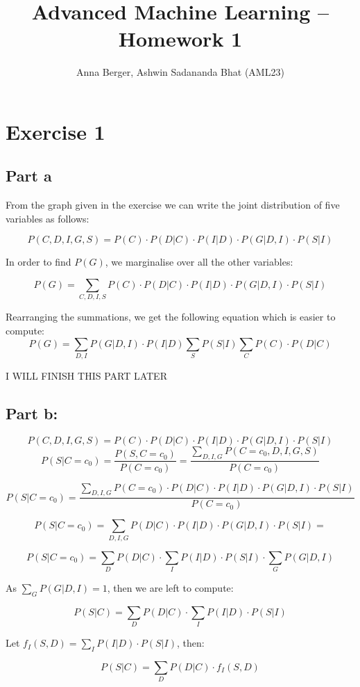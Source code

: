 \documentclass[11pt,a4paper]{article}
\title{\textbf{Advanced Machine Learning -- Homework 1}}
\author{Anna Berger, Ashwin Sadananda Bhat (AML23)}
\begin{document}
\maketitle
\section*{Exercise 1}

\subsection*{Part a}

From the graph given in the exercise we can write the joint distribution of five variables as follows:

$$ P(C,D,I,G,S) = P(C) \cdot  P(D|C)\cdot  P(I|D) \cdot  P(G|D,I) \cdot  P(S|I) $$ 

In order to find $P(G)$, we marginalise over all the other variables:

$$ P(G) = \sum_{C, D, I, S} P(C) \cdot  P(D|C)\cdot P(I|D)\cdot P(G|D,I)\cdot P(S|I) $$ 

Rearranging the summations, we get the following equation which is easier to compute:
$$ P(G) = \sum_{D, I} P(G|D,I)\cdot P(I|D) \sum_{S} P(S | I)  \sum_{C} P(C) \cdot  P(D|C) $$ 


I WILL FINISH THIS PART LATER

\subsection*{Part b:}

$$ P(C,D,I,G,S) = P(C)\cdot P(D|C)\cdot P(I|D)\cdot P(G|D,I)\cdot P(S|I) $$
$$  P(S|C = c_0) = \frac{P(S, C = c_0)}{P(C = c_0)} =  \frac{\sum_{D,I,G} P(C = c_0,D,I,G,S)}{P(C = c_0)} $$

$$ P(S|C = c_0) =  \frac{\sum_{D,I,G} P(C = c_0)\cdot P(D|C)\cdot P(I|D)\cdot P(G|D,I)\cdot P(S|I)}{P(C = c_0)} $$ 

$$ P(S|C = c_0)  = \sum_{D,I,G} P(D|C)\cdot P(I|D)\cdot P(G|D,I)\cdot P(S|I) = $$

$$ P(S|C = c_0)  = \sum_{D} P(D|C) \cdot  \sum_{I}P(I|D)\cdot P(S|I) \cdot \sum_{G}P(G|D,I)  \label{eq:1.1} $$

As $ \sum_{G}P(G|D,I) = 1$, then we are left to compute:

$$ P(S|C) = \sum_{D} P(D|C) \cdot  \sum_{I}P(I|D)\cdot P(S|I)$$

Let $ f_I(S,D) = \sum_{I}P(I|D)\cdot P(S|I)$, then:


$$ P(S|C) = \sum_{D}P(D|C) \cdot  f_I(S,D) $$
\end{document}
